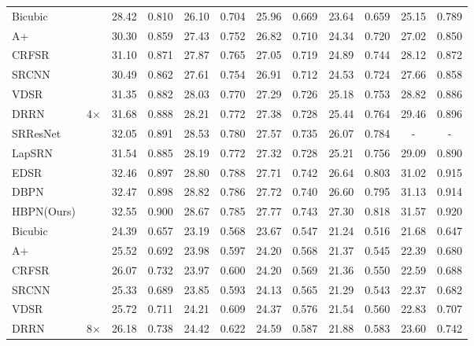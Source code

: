 \documentclass[10pt,twocolumn,letterpaper]{article}
\begin{document}
\begin{table*}[t]
\begin{center}
\begin{small}
{\begin{tabular}{lccccccccccc}
Bicubic &  & 28.42 & 0.810 & 26.10 & 0.704 & 25.96 & 0.669 & 23.64 & 0.659 & 25.15 & 0.789 \\
A+~\cite{Timofte2015} &  & 30.30 & 0.859 & 27.43 & 0.752 & 26.82 & 0.710 & 24.34 & 0.720 & 27.02 & 0.850 \\
CRFSR~\cite{ICIP18} &  & 31.10 & 0.871 & 27.87 & 0.765 & 27.05 & 0.719 & 24.89 & 0.744 & 28.12 & 0.872 \\
SRCNN~\cite{SRCNN} &  & 30.49 & 0.862 & 27.61 & 0.754 & 26.91 & 0.712 & 24.53 & 0.724 & 27.66 & 0.858 \\
VDSR~\cite{VDSR} &  & 31.35 & 0.882 & 28.03 & 0.770 & 27.29 & 0.726 & 25.18 & 0.753 & 28.82 & 0.886 \\
DRRN~\cite{DRRN} & 4$\times$ & 31.68 & 0.888 & 28.21 & 0.772 & 27.38 & 0.728 & 25.44 & 0.764 & 29.46 & 0.896 \\
SRResNet~\cite{SRGAN} &  & 32.05 & 0.891 & 28.53 & 0.780 & 27.57 & 0.735 & 26.07 & 0.784 & - & - \\
LapSRN~\cite{LapSRN} &  & 31.54 & 0.885 & 28.19 & 0.772 & 27.32 & 0.728 & 25.21 & 0.756 & 29.09 & 0.890 \\
EDSR~\cite{EDSR} &  & 32.46 & 0.897 & {\color{blue}28.80} & {\color{red}0.788} & 27.71 & {\color{blue}0.742} & {\color{blue}26.64} & {\color{blue}0.803} & 31.02 & {\color{blue}0.915} \\
DBPN~\cite{DBPN} &  & {\color{blue}32.47} & {\color{blue}0.898} & {\color{red}28.82} & {\color{blue}0.786} & {\color{blue}27.72} & 0.740 & 26.60 & 0.795 & {\color{blue}31.13} & 0.914 \\
HBPN(Ours) &  & {\color{red}32.55} & {\color{red}0.900} & 28.67 & 0.785 & {\color{red}27.77} & {\color{red}0.743} & {\color{red}27.30} & {\color{red}0.818} & {\color{red}31.57} & {\color{red}0.920} \\ \hline
Bicubic &  & 24.39 & 0.657 & 23.19 & 0.568 & 23.67 & 0.547 & 21.24 & 0.516 & 21.68 & 0.647 \\
A+~\cite{Timofte2015} &  & 25.52 & 0.692 & 23.98 & 0.597 & 24.20 & 0.568 & 21.37 & 0.545 & 22.39 & 0.680 \\
CRFSR~\cite{ICIP18} &  & 26.07 & 0.732 & 23.97 & 0.600 & 24.20 & 0.569 & 21.36 & 0.550 & 22.59 & 0.688 \\
SRCNN~\cite{SRCNN} &  & 25.33 & 0.689 & 23.85 & 0.593 & 24.13 & 0.565 & 21.29 & 0.543 & 22.37 & 0.682 \\
VDSR~\cite{VDSR} &  & 25.72 & 0.711 & 24.21 & 0.609 & 24.37 & 0.576 & 21.54 & 0.560 & 22.83 & 0.707 \\
DRRN~\cite{DRRN} & 8$\times$ & 26.18 & 0.738 & 24.42 & 0.622 & 24.59 & 0.587 & 21.88 & 0.583 & 23.60 & 0.742 \\

\end{tabular}}
\end{small}
\end{center}
\end{table*}
\end{document}
